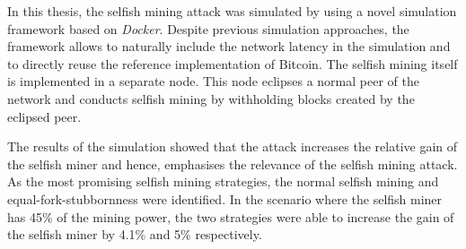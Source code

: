 In this thesis, the selfish mining attack was simulated by using a novel simulation framework based on \textit{Docker}.
Despite previous simulation approaches, the framework allows to naturally include the network latency in the simulation and to directly reuse the reference implementation of Bitcoin.
The selfish mining itself is implemented in a separate node.
This node eclipses a normal peer of the network and conducts selfish mining by withholding blocks created by the eclipsed peer.

The results of the simulation showed that the attack increases the relative gain of the selfish miner and hence, emphasises the relevance of the selfish mining attack.
As the most promising selfish mining strategies, the normal selfish mining and equal-fork-stubbornness were identified.
In the scenario where the selfish miner has 45\% of the mining power, the two strategies were able to increase the gain of the selfish miner by 4.1\% and 5\% respectively.
